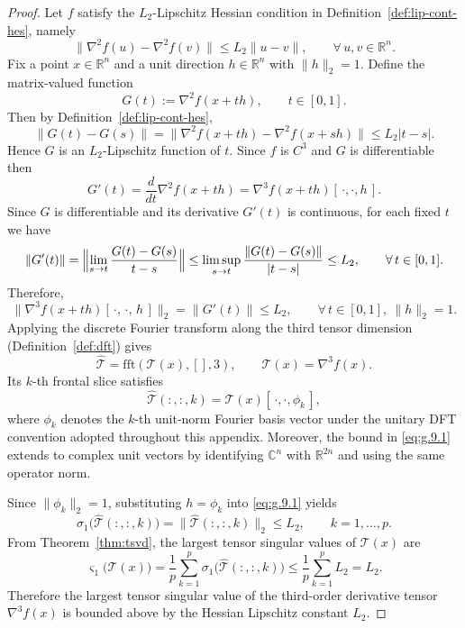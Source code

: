 \documentclass[10pt,a4paper]{amsart}
\begin{document}
\begin{proof}
Let $f$ satisfy the $L_2$-Lipschitz Hessian condition in 
Definition~\ref{def:lip-cont-hes}, namely
\[
\|\nabla^{2} f(u)-\nabla^{2} f(v)\|\le L_2\|u-v\|,
\qquad \forall\,u,v\in\mathbb{R}^n.
\]
Fix a point $x\in\mathbb{R}^n$ and a unit direction $h\in\mathbb{R}^n$ with 
$\|h\|_2=1$.  
Define the matrix-valued function
\[
G(t) := \nabla^2 f(x + t h), \qquad t\in [0,1].
\]
Then by Definition~\ref{def:lip-cont-hes},
\[
\|G(t)-G(s)\|
= \|\nabla^2 f(x+th)-\nabla^2 f(x+sh)\|
\le L_2|t-s|.
\]
Hence $G$ is an $L_2$-Lipschitz function of $t$.  
Since $f$ is $C^3$ and $G$ is differentiable then
\[
G'(t)
= \frac{d}{dt}\nabla^2 f(x+th)
= \nabla^3 f(x+th)[\,\cdot,\cdot,h\,].
\]
Since $G$ is differentiable and its derivative $G'(t)$ is continuous,
for each fixed $t$ we have
\[
\|G'(t)\|
= \Bigl\|\lim_{s\to t}\frac{G(t)-G(s)}{t-s}\Bigr\|
\le \limsup_{s\to t}\frac{\|G(t)-G(s)\|}{|t-s|}
\le L_2, \qquad  \forall\,t\in[0,1].
\]
Therefore,
\begin{equation}\label{eq:g.9.1}
\big\|\nabla^3 f(x+th)[\,\cdot,\,\cdot,\,h\,]\big\|_2
= \|G'(t)\|
\le L_2,
\qquad \forall\,t\in[0,1],\ \|h\|_2=1.
\end{equation}
Applying the discrete Fourier transform along the third tensor dimension 
(Definition~\ref{def:dft}) gives
\[
\widehat{\mathcal{T}}
= \mathrm{fft}(\mathcal{T}(x),[],3),
\qquad 
\mathcal{T}(x)=\nabla^3 f(x).
\]
Its $k$-th frontal slice satisfies
\[
\widehat{\mathcal{T}}(:,:,k)
=\mathcal{T}(x)[\,\cdot,\cdot,\phi_k\,],
\]
where $\phi_k$ denotes the $k$-th unit-norm Fourier basis vector under the unitary DFT convention adopted throughout this appendix. 
Moreover, the bound in \eqref{eq:g.9.1} extends to complex unit vectors by identifying $\mathbb{C}^n$ with $\mathbb{R}^{2n}$ and using the same operator norm.

Since $\|\phi_k\|_2=1$, substituting $h=\phi_k$ into 
\eqref{eq:g.9.1} yields
\[
\sigma_{1}\!\big(\widehat{\mathcal{T}}(:,:,k)\big) =
\big\|\widehat{\mathcal{T}}(:,:,k)\big\|_2
\le L_2,
\qquad k=1,\dots,p.
\]
From Theorem~\ref{thm:tsvd}, the largest tensor singular values of $\mathcal{T}(x)$ are
\[
\varsigma_1\!\big(\mathcal{T}(x)\big)
= \frac{1}{p}\sum_{k=1}^{p}\sigma_{1}\!\big(\widehat{\mathcal{T}}(:,:,k)\big)
\le \frac{1}{p}\sum_{k=1}^{p}L_2
= L_2.
\]
Therefore the largest tensor singular value of the third-order derivative tensor
$\nabla^3 f(x)$ is bounded above by the Hessian Lipschitz constant $L_2$.
\end{proof}
\end{document}
